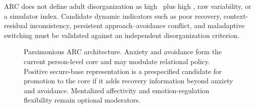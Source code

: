 ARC does not define adult disorganization as high \Anx\ plus high \Avo, raw variability, or a simulator index. Candidate dynamic indicators such as poor recovery, context-residual inconsistency, persistent approach--avoidance conflict, and maladaptive switching must be validated against an independent disorganization criterion.

\begin{figure}[htbp]
\centering
\resizebox{\linewidth}{!}{}
\caption{Parsimonious ARC architecture. Anxiety and avoidance form the current person-level core and may modulate relational policy. Positive secure-base representation is a prespecified candidate for promotion to the core if it adds recovery information beyond anxiety and avoidance. Mentalized affectivity and emotion-regulation flexibility remain optional moderators.}
\label{fig:arc2-framework}
\end{figure}

